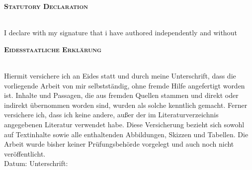 
\begin{center}
\large \textsc{\textbf{Statutory Declaration}} \\
~\\ %



\end{center}

I declare with my signature that i have authored independently and without 

\vfill %
\begin{center}
\large \textsc{ \textbf{Eidesstaatliche Erkl\"arung} } \\
~\\ %
\end{center}

Hiermit versichere ich an Eides statt und durch meine Unterschrift, dass die vorliegende Arbeit von mir selbstständig, ohne fremde Hilfe angefertigt worden ist. Inhalte und Passagen, die aus fremden Quellen stammen und direkt oder indirekt übernommen worden sind, wurden als solche kenntlich gemacht. Ferner versichere ich, dass ich keine andere, außer der im Literaturverzeichnis angegebenen Literatur verwendet habe. Diese Versicherung bezieht sich sowohl auf Textinhalte sowie alle enthaltenden Abbildungen, Skizzen und Tabellen. Die Arbeit wurde bisher keiner Prüfungsbehörde vorgelegt und auch noch nicht veröffentlicht. 
\\[1.5cm]
Datum:	\hrulefill\enspace Unterschrift: \hrulefill
\\[3.5cm]